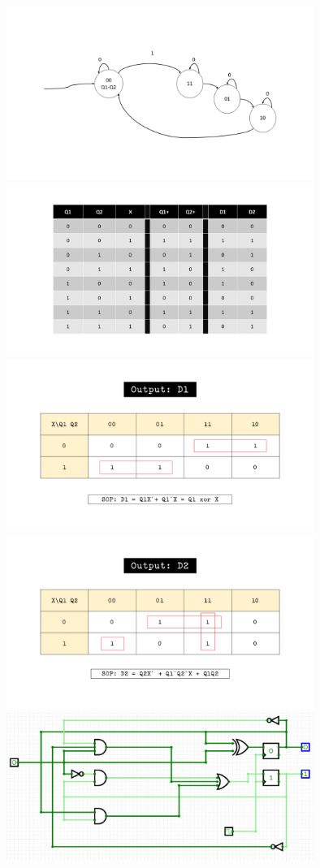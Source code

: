 \documentclass[a4paper]{article}
\begin{document}
\section{}
\begin{center}
\includegraphics[width=10cm]{images/state-machine-2.png}
\includegraphics[width=10cm]{images/truth-table.png}
\includegraphics[width=10cm]{images/d1.png}
\includegraphics[width=10cm]{images/d2.png}
\includegraphics[width=10cm]{images/big-cir.jpg}
\end{center}
\end{document}
